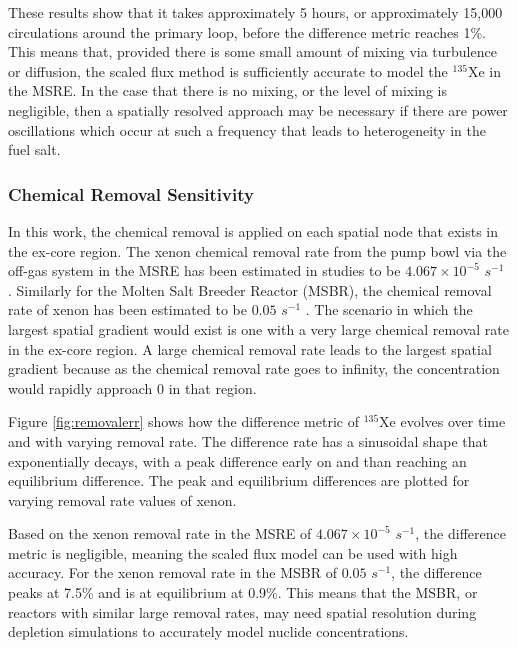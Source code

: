 \documentclass{style/nseJournal}
\begin{document}
These results show that it takes approximately 5 hours, or approximately 15,000 circulations around the primary loop, before the difference metric reaches 1\%.
This means that, provided there is some small amount of mixing via turbulence or diffusion, the scaled flux method is sufficiently accurate to model the $^{135}$Xe in the MSRE.
In the case that there is no mixing, or the level of mixing is negligible, then a spatially resolved approach may be necessary if there are power oscillations which occur at such a frequency that leads to heterogeneity in the fuel salt.
\FloatBarrier

\subsubsection{Chemical Removal Sensitivity}

In this work, the chemical removal is applied on each spatial node that exists in the ex-core region.
The xenon chemical removal rate from the pump bowl via the off-gas system in the MSRE has been estimated in studies to be $4.067 \times 10^{-5}$ $s^{-1}$ \cite{lo2022application}.
Similarly for the Molten Salt Breeder Reactor (MSBR), the chemical removal rate of xenon has been estimated to be $0.05$ $s^{-1}$ \cite{robertson1971conceptual}.
The scenario in which the largest spatial gradient would exist is one with a very large chemical removal rate in the ex-core region.
A large chemical removal rate leads to the largest spatial gradient because as the chemical removal rate goes to infinity, the concentration would rapidly approach 0 in that region.

Figure \ref{fig:removalerr} shows how the difference metric of $^{135}$Xe evolves over time and with varying removal rate.
The difference rate has a sinusoidal shape that exponentially decays, with a peak difference early on and than reaching an equilibrium difference.
The peak and equilibrium differences are plotted for varying removal rate values of xenon.

Based on the xenon removal rate in the MSRE of $4.067 \times 10^{-5}$ $s^{-1}$, the difference metric is negligible, meaning the scaled flux model can be used with high accuracy.
For the xenon removal rate in the MSBR of $0.05$ $s^{-1}$, the difference peaks at 7.5\% and is at equilibrium at 0.9\%.
This means that the MSBR, or reactors with similar large removal rates, may need spatial resolution during depletion simulations to accurately model nuclide concentrations.
\end{document}

